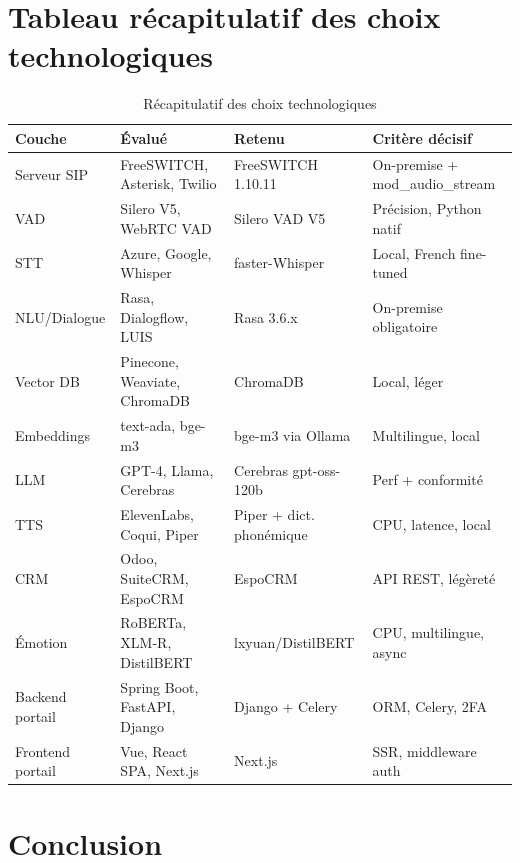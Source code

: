 \section{Tableau récapitulatif des choix technologiques}

\begin{table}[H]
  \centering
  \caption{Récapitulatif des choix technologiques}
  \label{tab:recap_techno}
  \begin{tabularx}{\textwidth}{lXlX}
    \toprule
    \textbf{Couche} & \textbf{Évalué} & \textbf{Retenu} & \textbf{Critère décisif} \\
    \midrule
    Serveur SIP    & FreeSWITCH, Asterisk, Twilio & FreeSWITCH 1.10.11 & On-premise + mod\_audio\_stream \\
    VAD            & Silero V5, WebRTC VAD & Silero VAD V5 & Précision, Python natif \\
    STT            & Azure, Google, Whisper & faster-Whisper & Local, French fine-tuned \\
    NLU/Dialogue   & Rasa, Dialogflow, LUIS & Rasa 3.6.x & On-premise obligatoire \\
    Vector DB      & Pinecone, Weaviate, ChromaDB & ChromaDB & Local, léger \\
    Embeddings     & text-ada, bge-m3 & bge-m3 via Ollama & Multilingue, local \\
    LLM            & GPT-4, Llama, Cerebras & Cerebras gpt-oss-120b & Perf + conformité \\
    TTS            & ElevenLabs, Coqui, Piper & Piper + dict. phonémique & CPU, latence, local \\
    CRM            & Odoo, SuiteCRM, EspoCRM & EspoCRM & API REST, légèreté \\
    Émotion        & RoBERTa, XLM-R, DistilBERT & lxyuan/DistilBERT & CPU, multilingue, async \\
    Backend portail & Spring Boot, FastAPI, Django & Django + Celery & ORM, Celery, 2FA \\
    Frontend portail & Vue, React SPA, Next.js & Next.js & SSR, middleware auth \\
    \bottomrule
  \end{tabularx}
\end{table}

\section{Conclusion}

